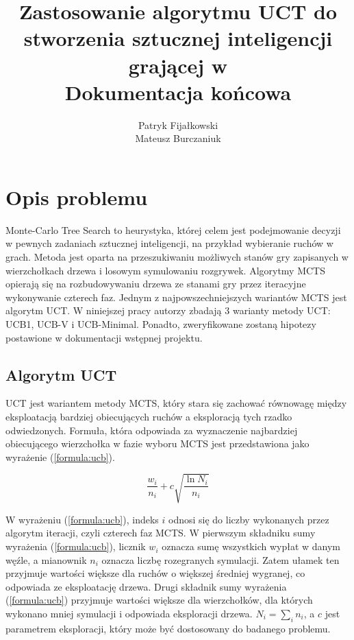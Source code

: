 \documentclass[a4paper,12pt]{article}
\title{
	Zastosowanie algorytmu UCT do stworzenia sztucznej inteligencji grającej w \nazwagry\\
	\large Dokumentacja końcowa}
\author{Patryk Fijałkowski \\ Mateusz Burczaniuk}
\let\oldsection\section
\renewcommand\section{\clearpage\oldsection}
\begin{document}
\begin{titlingpage}
	\maketitle
	\vspace{3cm}
\end{titlingpage}

\section{Opis problemu}
Monte-Carlo Tree Search to heurystyka, której celem jest podejmowanie decyzji w pewnych zadaniach sztucznej inteligencji, na przykład wybieranie ruchów w grach. Metoda jest oparta na przeszukiwaniu możliwych stanów gry zapisanych w wierzchołkach drzewa i losowym symulowaniu rozgrywek. Algorytmy MCTS opierają się na rozbudowywaniu drzewa ze stanami gry przez iteracyjne wykonywanie czterech faz. Jednym z najpowszechniejszych wariantów MCTS jest algorytm UCT. W niniejszej pracy autorzy zbadają 3 warianty metody UCT: UCB1, UCB-V i UCB-Minimal. Ponadto, zweryfikowane zostaną hipotezy postawione w dokumentacji wstępnej projektu.


\subsection{Algorytm UCT} \label{subsec:uct}
UCT jest wariantem metody MCTS, który stara się zachować równowagę między eksploatacją bardziej obiecujących ruchów a eksploracją tych rzadko odwiedzonych. Formuła, która odpowiada za wyznaczenie najbardziej obiecującego wierzchołka w fazie wyboru MCTS jest przedstawiona jako wyrażenie (\ref{formula:ucb}).

\begin{equation}\label{formula:ucb}
\frac{w_i}{n_i} + c \sqrt{\frac{\ln N_i}{n_i}}
\end{equation}

W wyrażeniu (\ref{formula:ucb}), indeks $i$ odnosi się do liczby wykonanych przez algorytm iteracji, czyli czterech faz MCTS. W pierwszym składniku sumy wyrażenia (\ref{formula:ucb}), licznik $w_i$ oznacza sumę wszystkich wypłat w danym węźle, a mianownik $n_i$ oznacza liczbę rozegranych symulacji. Zatem ułamek ten przyjmuje wartości większe dla ruchów o większej średniej wygranej, co odpowiada ze eksploatację drzewa. Drugi składnik sumy wyrażenia (\ref{formula:ucb}) przyjmuje wartości większe dla wierzchołków, dla których wykonano mniej symulacji i odpowiada eksploracji drzewa. $N_i=\sum_i n_i$, a $c$ jest parametrem eksploracji, który może być dostosowany do badanego problemu.
\end{document}
